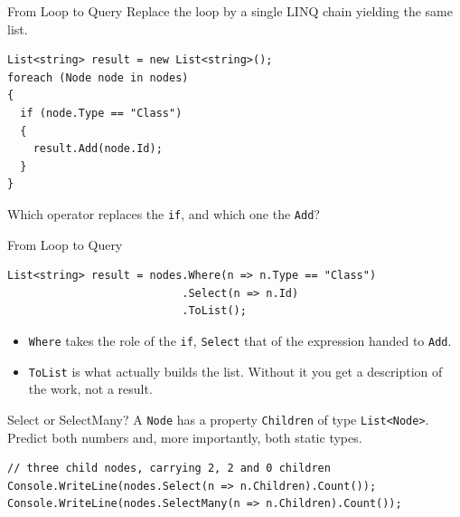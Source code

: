 \begin{exerciseframe}{From Loop to Query}
  Replace the loop by a single LINQ chain yielding the same list.
  \vspace{1ex}

  \begin{lstlisting}[basicstyle=\scriptsize\ttfamily]
List<string> result = new List<string>();
foreach (Node node in nodes)
{
  if (node.Type == "Class")
  {
    result.Add(node.Id);
  }
}
  \end{lstlisting}
  \vspace{1ex}

  Which operator replaces the \texttt{if}, and which one the \texttt{Add}?
\end{exerciseframe}

\begin{solutionframe}{From Loop to Query}
  \begin{lstlisting}[basicstyle=\scriptsize\ttfamily]
List<string> result = nodes.Where(n => n.Type == "Class")
                           .Select(n => n.Id)
                           .ToList();
  \end{lstlisting}
  \begin{itemize}
    \item \texttt{Where} takes the role of the \texttt{if}, \texttt{Select}
      that of the expression handed to \texttt{Add}.
    \item \texttt{ToList} is what actually builds the list. Without it you get
      a description of the work, not a result.
  \end{itemize}
  \vspace{4ex}

\end{solutionframe}

\begin{exerciseframe}{Select or SelectMany?}
  A \texttt{Node} has a property \texttt{Children} of type
  \texttt{List<Node>}. Predict both numbers and, more importantly, both static
  types.
  \vspace{1ex}

  \begin{lstlisting}[basicstyle=\scriptsize\ttfamily]
// three child nodes, carrying 2, 2 and 0 children
Console.WriteLine(nodes.Select(n => n.Children).Count());
Console.WriteLine(nodes.SelectMany(n => n.Children).Count());
  \end{lstlisting}
\end{exerciseframe}

